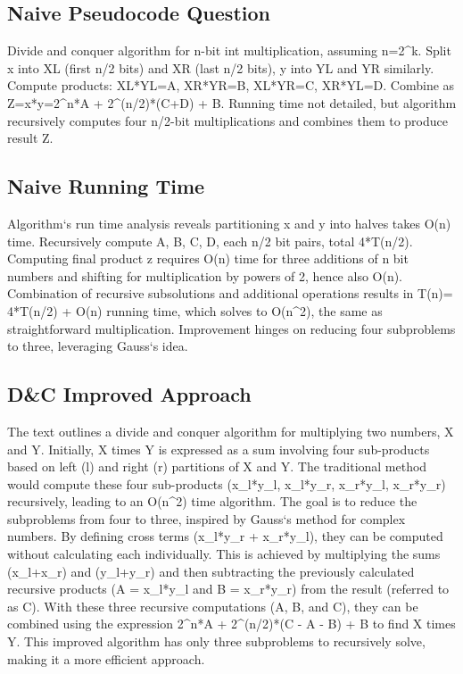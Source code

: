 \subsection*{Naive  Pseudocode Question}
Divide and conquer algorithm for n-bit int multiplication, assuming n=2\textasciicircum{}k.
Split x into XL (first n/2 bits) and XR (last n/2 bits), y into YL and YR similarly.
Compute products: XL*YL=A, XR*YR=B, XL*YR=C, XR*YL=D\@.
Combine as Z=x*y=2\textasciicircum{}n*A + 2\textasciicircum{}(n/2)*(C+D) + B\@.
Running time not detailed, but algorithm recursively computes four n/2-bit multiplications and combines them to produce result Z\@.

\subsection*{Naive  Running Time}
Algorithm`s run time analysis reveals partitioning x and y into halves takes O(n) time.
Recursively compute A, B, C, D, each n/2 bit pairs, total 4*T(n/2).
Computing final product z requires O(n) time for three additions of n bit numbers and shifting for multiplication by powers of 2, hence also O(n).
Combination of recursive subsolutions and additional operations results in T(n)= 4*T(n/2) + O(n) running time, which solves to O(n\textasciicircum{}2), the same as straightforward multiplication.
Improvement hinges on reducing four subproblems to three, leveraging Gauss`s idea.

\subsection*{D\&C  Improved Approach}
The text outlines a divide and conquer algorithm for multiplying two numbers, X and Y\@.
Initially, X times Y is expressed as a sum involving four sub-products based on left (l) and right (r) partitions of X and Y\@.
The traditional method would compute these four sub-products (x\_l*y\_l, x\_l*y\_r, x\_r*y\_l, x\_r*y\_r) recursively, leading to an O(n\textasciicircum{}2) time algorithm.
The goal is to reduce the subproblems from four to three, inspired by Gauss`s method for complex numbers.
By defining cross terms (x\_l*y\_r + x\_r*y\_l), they can be computed without calculating each individually.
This is achieved by multiplying the sums (x\_l+x\_r) and (y\_l+y\_r) and then subtracting the previously calculated recursive products (A = x\_l*y\_l and B = x\_r*y\_r) from the result (referred to as C).
With these three recursive computations (A, B, and C), they can be combined using the expression 2\textasciicircum{}n*A + 2\textasciicircum{}(n/2)*(C - A - B) + B to find X times Y\@.
This improved algorithm has only three subproblems to recursively solve, making it a more efficient approach.

